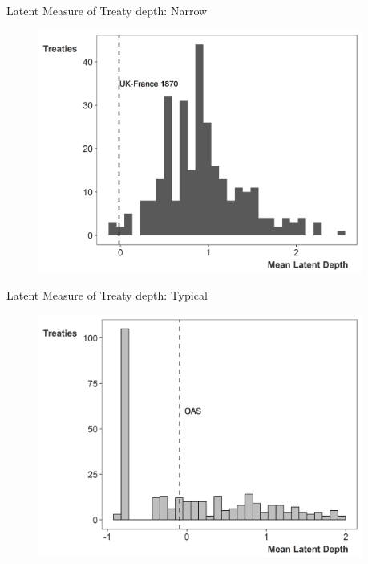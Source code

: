 \documentclass[12pt]{beamer}
\begin{document}

\begin{frame}{Latent Measure of Treaty depth: Narrow}

\begin{figure}[htbp]
	\centering
		\includegraphics[width=0.95\textwidth]{ld-hist-shallow.png}
\end{figure}


\end{frame} 


\begin{frame}{Latent Measure of Treaty depth: Typical}

\begin{figure}[htbp]
	\centering
		\includegraphics[width=0.95\textwidth]{ld-hist-median.png}
\end{figure}


\end{frame} 
\end{document}
